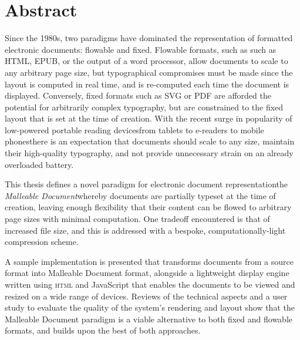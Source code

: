 \cleardoublepage
\begingroup
\let\clearpage\relax
\let\cleardoublepage\relax
\let\cleardoublepage\relax

\chapter*{Abstract}

Since the 1980s, two paradigms have dominated the representation of formatted electronic documents: flowable and fixed. Flowable formats, such as such as HTML, EPUB, or the output of a word processor, allow documents to scale to any arbitrary page size, but typographical compromises must be made since the layout is computed in real time, and is re-computed each time the document is displayed. Conversely, fixed formats such as SVG or PDF are afforded the potential for arbitrarily complex typography, but are constrained to the fixed layout that is set at the time of creation. With the recent surge in popularity of low-powered portable reading devices\ed{}from tablets to e-readers to mobile phones\ed{}there is an expectation that documents should scale to any size, maintain their high-quality typography, and not provide unnecessary strain on an already overloaded battery.

This thesis defines a novel paradigm for electronic document representation\ed{}the \emph{Malleable Document}\ed{}whereby documents are partially typeset at the time of creation, leaving enough flexibility that their content can be flowed to arbitrary page sizes with minimal computation. One tradeoff encountered is that of increased file size, and this is addressed with a bespoke, computationally-light compression scheme.

A sample implementation is presented that transforms documents from a source format into Malleable Document format, alongside a lightweight display engine written using \textsc{html} and JavaScript that enables the documents to be viewed and resized on a wide range of devices. Reviews of the technical aspects and a user study to evaluate the quality of the system's rendering and layout show that the Malleable Document paradigm is a viable alternative to both fixed and flowable formats, and builds upon the best of both approaches.


\endgroup

\vfill